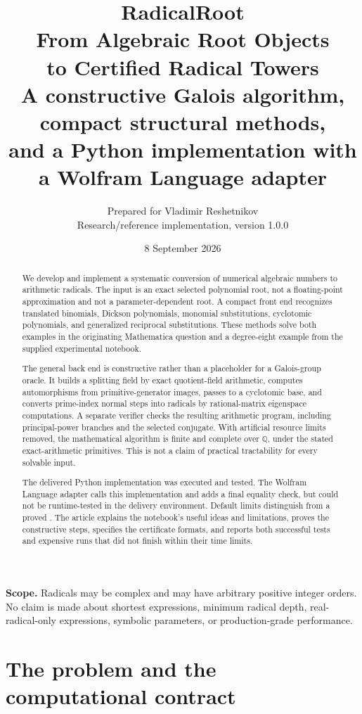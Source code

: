 \documentclass[11pt,letterpaper]{article}
\title{\textbf{RadicalRoot}\\[0.35em]\Large From Algebraic Root Objects\\to Certified Radical Towers\\[0.5em]\large A constructive Galois algorithm, compact structural methods,\\and a Python implementation with a Wolfram Language adapter}
\author{Prepared for Vladimir Reshetnikov\\\small Research/reference implementation, version 1.0.0}
\date{8 September 2026}
\theoremstyle{definition}\newtheorem{definition}[theorem]{Definition}
\theoremstyle{remark}\newtheorem{remark}[theorem]{Remark}
\newcommand{\Q}{\mathbb Q}\newcommand{\C}{\mathbb C}\newcommand{\Z}{\mathbb Z}
\newcommand{\code}[1]{\texttt{\detokenize{#1}}}
\begin{document}
\maketitle
\thispagestyle{empty}
\begin{abstract}
We develop and implement a systematic conversion of numerical algebraic numbers to arithmetic radicals. The input is an exact selected polynomial root, not a floating-point approximation and not a parameter-dependent root. A compact front end recognizes translated binomials, Dickson polynomials, monomial substitutions, cyclotomic polynomials, and generalized reciprocal substitutions. These methods solve both examples in the originating Mathematica question and a degree-eight example from the supplied experimental notebook.

The general back end is constructive rather than a placeholder for a Galois-group oracle. It builds a splitting field by exact quotient-field arithmetic, computes automorphisms from primitive-generator images, passes to a cyclotomic base, and converts prime-index normal steps into radicals by rational-matrix eigenspace computations. A separate verifier checks the resulting arithmetic program, including principal-power branches and the selected conjugate. With artificial resource limits removed, the mathematical algorithm is finite and complete over $\Q$, under the stated exact-arithmetic primitives. This is not a claim of practical tractability for every solvable input.

The delivered Python implementation was executed and tested. The Wolfram Language adapter calls this implementation and adds a final \code{RootReduce} equality check, but could not be runtime-tested in the delivery environment. Default limits distinguish \code{Unknown} from a proved \code{NotSolvable}. The article explains the notebook's useful ideas and limitations, proves the constructive steps, specifies the certificate formats, and reports both successful tests and expensive runs that did not finish within their time limits.
\end{abstract}
\vfill
\noindent\textbf{Scope.} Radicals may be complex and may have arbitrary positive integer orders. No claim is made about shortest expressions, minimum radical depth, real-radical-only expressions, symbolic parameters, or production-grade performance.
\clearpage
\tableofcontents
\clearpage

\section{The problem and the computational contract}
\end{document}
